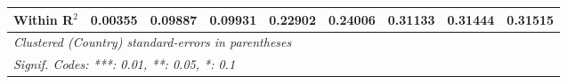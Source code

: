 \begin{table}[htbp]
\begin{tabular}{lcccccccc}
      Within R$^2$                                                                    & 0.00355  & 0.09887  & 0.09931  & 0.22902      & 0.24006       & 0.31133       & 0.31444       & 0.31515\\  
      \midrule \midrule
      \multicolumn{9}{l}{\emph{Clustered (Country) standard-errors in parentheses}}\\
      \multicolumn{9}{l}{\emph{Signif. Codes: ***: 0.01, **: 0.05, *: 0.1}}\\
   \end{tabular}
\end{table}


